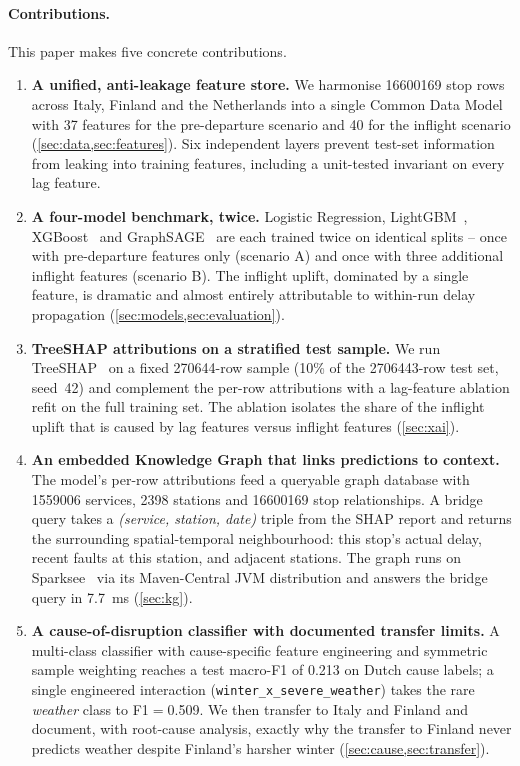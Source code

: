 \paragraph{Contributions.} This paper makes five concrete contributions.

\begin{enumerate}
    \item \textbf{A unified, anti-leakage feature store.} We harmonise \num{16600169} stop rows across Italy, Finland and the Netherlands into a single Common Data Model with 37 features for the pre-departure scenario and 40 for the inflight scenario (\cref{sec:data,sec:features}). Six independent layers prevent test-set information from leaking into training features, including a unit-tested invariant on every lag feature.
    \item \textbf{A four-model benchmark, twice.} Logistic Regression, LightGBM~\cite{ke2017lightgbm}, XGBoost~\cite{chen2016xgboost} and GraphSAGE~\cite{hamilton2017inductive} are each trained twice on identical splits -- once with pre-departure features only (scenario A) and once with three additional inflight features (scenario B). The inflight uplift, dominated by a single feature, is dramatic and almost entirely attributable to within-run delay propagation (\cref{sec:models,sec:evaluation}).
    \item \textbf{TreeSHAP attributions on a stratified test sample.} We run TreeSHAP~\cite{lundberg2017unified,lundberg2020local} on a fixed \num{270644}-row sample (10\% of the \num{2706443}-row test set, seed~42) and complement the per-row attributions with a lag-feature ablation refit on the full training set. The ablation isolates the share of the inflight uplift that is caused by lag features versus inflight features (\cref{sec:xai}).
    \item \textbf{An embedded Knowledge Graph that links predictions to context.} The model's per-row attributions feed a queryable graph database with \num{1559006} services, \num{2398} stations and \num{16600169} stop relationships. A bridge query takes a \emph{(service, station, date)} triple from the SHAP report and returns the surrounding spatial-temporal neighbourhood: this stop's actual delay, recent faults at this station, and adjacent stations. The graph runs on Sparksee~\cite{sparksee2024,martinez2017dex} via its Maven-Central JVM distribution and answers the bridge query in \SI{7.7}{ms} (\cref{sec:kg}).
    \item \textbf{A cause-of-disruption classifier with documented transfer limits.} A multi-class classifier with cause-specific feature engineering and symmetric sample weighting reaches a test macro-F1 of \num{0.213} on Dutch cause labels; a single engineered interaction (\texttt{winter\_x\_severe\_weather}) takes the rare \emph{weather} class to F1$=$\num{0.509}. We then transfer to Italy and Finland and document, with root-cause analysis, exactly why the transfer to Finland never predicts weather despite Finland's harsher winter (\cref{sec:cause,sec:transfer}).
\end{enumerate}

